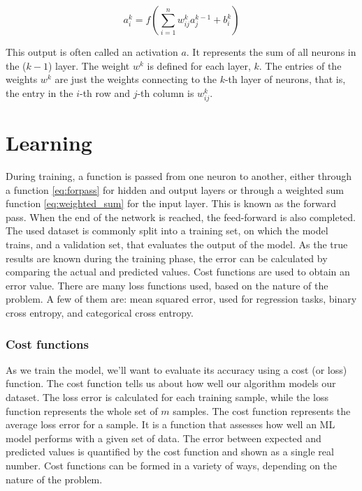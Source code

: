 \begin{equation}
	a_i^k =f\left(\sum_{i=1}^{n} w_{ij}^k a_j^{k-1} + b_i^k\right)
	\label{eq:forpasshidden}
\end{equation}

This output is often called an activation $a$. It represents the sum of all neurons in the ($k-1$) layer. The weight $w^k$ is defined for each layer, $k$. The entries of the weights $w^k$ are just the weights connecting to the $k$-th layer of neurons, that is, the entry in the $i$-th row and $j$-th column is $w^k_{ij}$.


\section{Learning}

During training, a function is passed from one neuron to another, either through a function \ref{eq:forpass} for hidden and output layers or through a weighted sum function \ref{eq:weighted_sum} for the input layer. This is known as the forward pass. When the end of the network is reached, the feed-forward is also completed.\newline
The used dataset is commonly split into a training set, on which the model trains, and a validation set, that evaluates the output of the model. 
As the true results are known during the training phase, the error can be calculated by comparing the actual and predicted values. Cost functions are used to obtain an error value.\newline
There are many loss functions used, based on the nature of the problem. A few of them are: mean squared error, used for regression tasks, binary cross entropy, and categorical cross entropy.
\subsubsection*{Cost functions}
As we train the model, we’ll want to evaluate its accuracy using a cost (or loss) function. The cost function tells us about how well our algorithm models our dataset. The loss error is calculated for each training sample, while the loss function represents the whole set of $m$ samples. The cost function represents the average loss error for a sample. It is a function that assesses how well an ML model performs with a given set of data. The error between expected and predicted values is quantified by the cost function and shown as a single real number. Cost functions can be formed in a variety of ways, depending on the nature of the problem.
